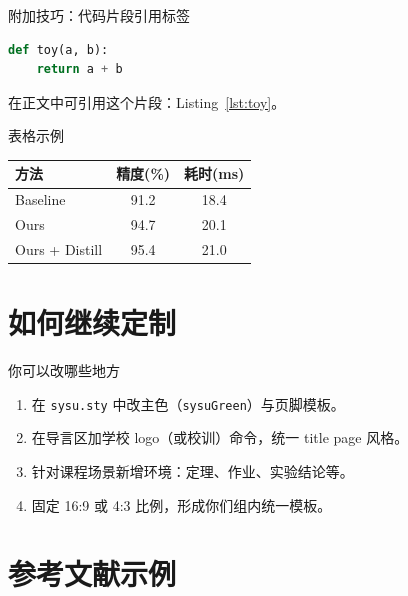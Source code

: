 \documentclass[11pt,aspectratio=169]{beamer}
\begin{document}
\begin{frame}[fragile]{附加技巧：代码片段引用标签}
\begin{lstlisting}[language=Python,style=sysucode,caption={一个可被引用的代码段},label={lst:toy}]
def toy(a, b):
    return a + b
\end{lstlisting}
在正文中可引用这个片段：Listing~\ref{lst:toy}。
\end{frame}

\begin{frame}{表格示例}
    \begin{table}
        \centering
        \begin{tabular}{lcc}
            \toprule
            方法 & 精度(\%) & 耗时(ms) \\
            \midrule
            Baseline & 91.2 & 18.4 \\
            Ours & 94.7 & 20.1 \\
            Ours + Distill & 95.4 & 21.0 \\
            \bottomrule
        \end{tabular}
    \end{table}
\end{frame}

\section{如何继续定制}

\begin{frame}{你可以改哪些地方}
    \begin{enumerate}
        \item 在 \texttt{sysu.sty} 中改主色（\texttt{sysuGreen}）与页脚模板。
        \item 在导言区加学校 logo（或校训）命令，统一 title page 风格。
        \item 针对课程场景新增环境：定理、作业、实验结论等。
        \item 固定 16:9 或 4:3 比例，形成你们组内统一模板。
    \end{enumerate}
\end{frame}

\section{参考文献示例}
\end{document}
